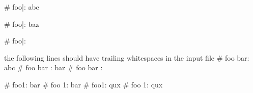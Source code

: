 # foo\bar:
  abc

# foo\bar: baz

# foo\bar:

the following lines should have trailing whitespaces in the input file                
# foo bar:                         
  abc                         
# foo bar : baz                         
# foo bar :                         

# foo1: bar
# foo 1: bar
# foo1:
  qux
# foo 1:
  qux
